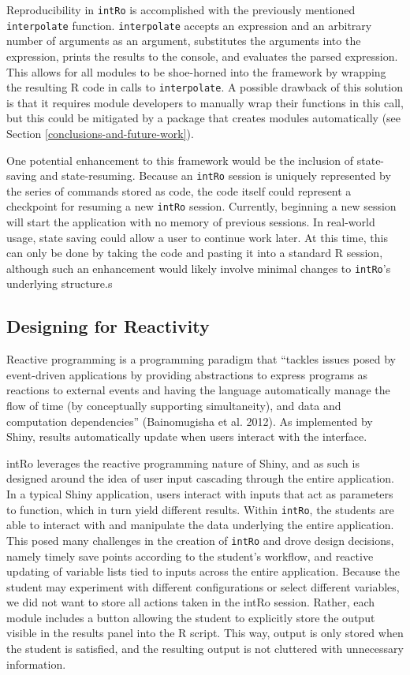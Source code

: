 \documentclass[12pt,]{article}
\begin{document}
Reproducibility in \texttt{intRo} is accomplished with the previously
mentioned \texttt{interpolate} function. \texttt{interpolate} accepts an
expression and an arbitrary number of arguments as an argument,
substitutes the arguments into the expression, prints the results to the
console, and evaluates the parsed expression. This allows for all
modules to be shoe-horned into the framework by wrapping the resulting R
code in calls to \texttt{interpolate}. A possible drawback of this
solution is that it requires module developers to manually wrap their
functions in this call, but this could be mitigated by a package that
creates modules automatically (see Section
\ref{conclusions-and-future-work}).

One potential enhancement to this framework would be the inclusion of
state-saving and state-resuming. Because an \texttt{intRo} session is
uniquely represented by the series of commands stored as code, the code
itself could represent a checkpoint for resuming a new \texttt{intRo}
session. Currently, beginning a new session will start the application
with no memory of previous sessions. In real-world usage, state saving
could allow a user to continue work later. At this time, this can only
be done by taking the code and pasting it into a standard R session,
although such an enhancement would likely involve minimal changes to
\texttt{intRo}'s underlying structure.s

\subsection{Designing for Reactivity}\label{designing-for-reactivity}

Reactive programming is a programming paradigm that ``tackles issues
posed by event-driven applications by providing abstractions to express
programs as reactions to external events and having the language
automatically manage the flow of time (by conceptually supporting
simultaneity), and data and computation dependencies'' (Bainomugisha et
al. 2012). As implemented by Shiny, results automatically update when
users interact with the interface.

intRo leverages the reactive programming nature of Shiny, and as such is
designed around the idea of user input cascading through the entire
application. In a typical Shiny application, users interact with inputs
that act as parameters to function, which in turn yield different
results. Within \texttt{intRo}, the students are able to interact with
and manipulate the data underlying the entire application. This posed
many challenges in the creation of \texttt{intRo} and drove design
decisions, namely timely save points according to the student's
workflow, and reactive updating of variable lists tied to inputs across
the entire application. Because the student may experiment with
different configurations or select different variables, we did not want
to store all actions taken in the intRo session. Rather, each module
includes a button allowing the student to explicitly store the output
visible in the results panel into the R script. This way, output is only
stored when the student is satisfied, and the resulting output is not
cluttered with unnecessary information.
\end{document}
